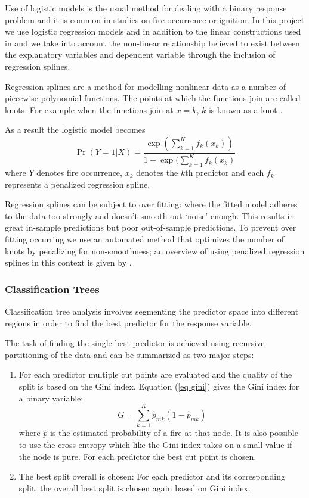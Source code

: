 \documentclass[11pt,a4paper]{article}
\begin{document}
Use of logistic models is the usual method for dealing with a binary response problem and it is common in studies on fire occurrence or ignition.  In this project we use logistic regression models and in addition to the linear constructions used in \citet{andrews03} and \citet{del11} we take into account the non-linear relationship believed to exist between the explanatory variables and dependent variable through the inclusion of regression splines.

Regression splines are a method for modelling nonlinear data as a number of piecewise  polynomial functions. The points at which the functions join are called knots. For example when the functions join at $x=k$, $k$ is known as a knot \citep{ruppert03}.

As a result the logistic model becomes
\begin{equation}
  \label{eq logits}
  \Pr(Y=1|X)=\frac{\exp(\sum_{k=1}^K f_k(x_k))}{1+\exp(\sum_{k=1}^K f_k(x_k)}
\end{equation}
where $Y$ denotes fire occurrence, $x_k$ denotes the $k$th predictor and each $f_k$ represents a penalized regression spline.

Regression splines can be subject to over fitting: where the fitted model adheres to the data too strongly and doesn't smooth out `noise' enough. This results in great in-sample predictions but poor out-of-sample predictions. To prevent over fitting occurring we use an automated method that optimizes the number of knots by penalizing for non-smoothness; an overview of using penalized regression splines in this context is given by \citet{wood02}.

\subsubsection{Classification Trees}

Classification tree analysis involves segmenting the predictor space into different regions in order to find the best predictor for the response variable.

The task of finding the single best predictor is achieved using recursive partitioning of the data and can be summarized as two major steps:
\begin{enumerate}
  \item For each predictor multiple cut points are evaluated and the quality of the split is based on the Gini index. Equation (\ref{eq gini}) gives the Gini index for a binary variable:
  \begin{equation}
          \label{eq gini}
          G=\sum_{k=1}^{K} \hat{p}_{mk} (1-\hat{p}_{mk})
  \end{equation}
  where $\hat{p}$ is the estimated probability of a fire at that node. It is also possible to use the cross entropy \citep{james13} which like the Gini index takes on a small value if the node is pure. For each predictor the best cut point is chosen.
  \item The best split overall is chosen:  For each predictor and its corresponding split, the overall best split is chosen again based on Gini index.
\end{enumerate}
\end{document}
